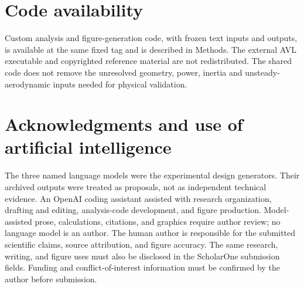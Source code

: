 \documentclass[10pt,letterpaper]{article}
\begin{document}
\section*{Code availability}
Custom analysis and figure-generation code, with frozen text inputs and outputs, is available at the same fixed tag and is described in Methods. The external AVL executable and copyrighted reference material are not redistributed. The shared code does not remove the unresolved geometry, power, inertia and unsteady-aerodynamic inputs needed for physical validation.

\section*{Acknowledgments and use of artificial intelligence}
The three named language models were the experimental design generators. Their
archived outputs were treated as proposals, not as independent technical
evidence. An OpenAI coding assistant assisted with research organization,
drafting and editing, analysis-code development, and figure production.
Model-assisted prose, calculations, citations, and graphics require author
review; no language model is an author. The human author is responsible for
the submitted scientific claims, source attribution, and figure accuracy.
The same research, writing, and figure uses must also be disclosed in the
ScholarOne submission fields. Funding and conflict-of-interest information
must be confirmed by the author before submission.

\begingroup\raggedright

\endgroup
\end{document}
